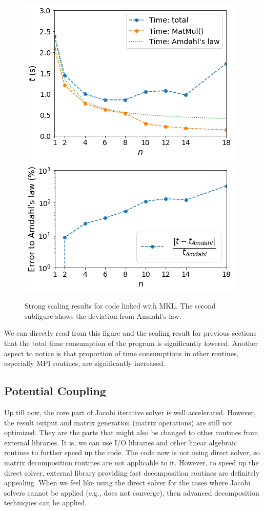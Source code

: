 \documentclass{article}
\begin{document}
\begin{spacing}{1.1}
\begin{figure}[H]
\centering
      \includegraphics[width=0.5\linewidth]{output/scaling-mkl.png}
      \includegraphics[width=0.5\linewidth]{output/scaling-error-mkl.png}
  \caption{Strong scaling results for code linked with MKL. The second subfigure shows the deviation from Amdahl's law.}
\end{figure}

We can directly read from this figure and the scaling result for previous sections that the total time consumption of the program is significantly lowered. Another aspect to notice is that proportion of time consumptions in other routines, especially MPI routines, are significantly increased.

\subsection{Potential Coupling}

Up till now, the core part of Jacobi iterative solver is well accelerated. However, the result output and matrix generation (matrix operations) are still not optimized. They are the parts that might also be changed to other routines from external libraries. It is, we can use I/O libraries and other linear algebraic routines to further speed up the code. The code now is not using direct solver, so matrix decomposition routines are not applicable to it. However, to speed up the direct solver, external library providing fast decomposition routines are definitely appealing. When we feel like using the direct solver for the cases where Jacobi solvers cannot be applied (e.g., does not converge), then advanced decomposition techniques can be applied.


\end{spacing}
\end{document}

